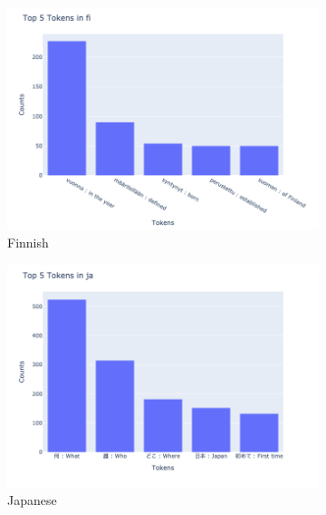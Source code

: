 \documentclass[11pt]{article}
\begin{document}
\begin{enumerate}
    \begin{figure}[t]
        \centering
        \begin{subfigure}[b]{0.1\textwidth}
            \centering
            \includegraphics[width=\textwidth]{week1_b_top_5_tokens_fi.png}
            \caption{Finnish}
            \label{fig:top_5_tokens_fi}
        \end{subfigure}
        \hfill
        \begin{subfigure}[b]{0.1\textwidth}
            \centering
            \includegraphics[width=\textwidth]{week1_b_top_5_tokens_ja.png}
            \caption{Japanese}
            \label{fig:top_5_tokens_ja}
        \end{subfigure}
        \hfill
        \begin{subfigure}[b]{0.1\textwidth}

\end{subfigure}
\end{figure}
\end{enumerate}
\end{document}
